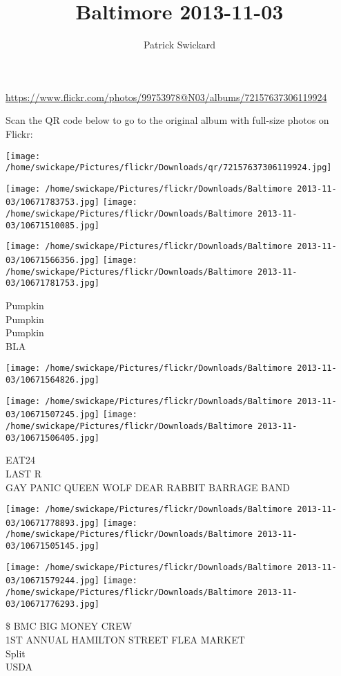 \documentclass[10pt,letterpaper]{article}
\title{Baltimore 2013-11-03}
\author{Patrick Swickard}
\date{}
\begin{document}
\maketitle

\url{https://www.flickr.com/photos/99753978@N03/albums/72157637306119924}

Scan the QR code below to go to the original album with full-size photos on Flickr:

\texttt{[image: /home/swickape/Pictures/flickr/Downloads/qr/72157637306119924.jpg]}
\pagebreak

\texttt{[image: /home/swickape/Pictures/flickr/Downloads/Baltimore 2013-11-03/10671783753.jpg]}
\texttt{[image: /home/swickape/Pictures/flickr/Downloads/Baltimore 2013-11-03/10671510085.jpg]}

\texttt{[image: /home/swickape/Pictures/flickr/Downloads/Baltimore 2013-11-03/10671566356.jpg]}
\texttt{[image: /home/swickape/Pictures/flickr/Downloads/Baltimore 2013-11-03/10671781753.jpg]}

Pumpkin\\
Pumpkin\\
Pumpkin\\
BLA
\pagebreak

\texttt{[image: /home/swickape/Pictures/flickr/Downloads/Baltimore 2013-11-03/10671564826.jpg]}

\vspace{0.25in}
\texttt{[image: /home/swickape/Pictures/flickr/Downloads/Baltimore 2013-11-03/10671507245.jpg]}
\texttt{[image: /home/swickape/Pictures/flickr/Downloads/Baltimore 2013-11-03/10671506405.jpg]}

EAT24\\
LAST R\\
GAY PANIC QUEEN WOLF DEAR RABBIT BARRAGE BAND
\pagebreak

\texttt{[image: /home/swickape/Pictures/flickr/Downloads/Baltimore 2013-11-03/10671778893.jpg]}
\texttt{[image: /home/swickape/Pictures/flickr/Downloads/Baltimore 2013-11-03/10671505145.jpg]}

\texttt{[image: /home/swickape/Pictures/flickr/Downloads/Baltimore 2013-11-03/10671579244.jpg]}
\texttt{[image: /home/swickape/Pictures/flickr/Downloads/Baltimore 2013-11-03/10671776293.jpg]}

\$ BMC BIG MONEY CREW\\
1ST ANNUAL HAMILTON STREET FLEA MARKET\\
Split\\
USDA
\pagebreak
\end{document}
